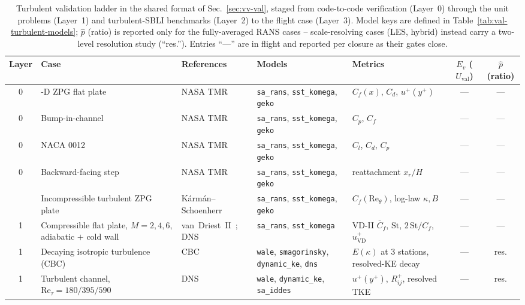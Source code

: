 \documentclass[journal,biblatex]{new-aiaa}
\newcommand{\Field}[1]{\texttt{#1}}
\begin{document}
\begin{table}[H]
\centering\scriptsize\setlength{\tabcolsep}{3.5pt}
\caption{Turbulent validation ladder in the shared format of
Sec.~\ref{sec:vv-val}, staged from code-to-code verification (Layer~0) through
the unit problems (Layer~1) and turbulent-SBLI benchmarks (Layer~2) to the
flight case (Layer~3). Model keys are defined in
Table~\ref{tab:val-turbulent-models}; $\hat p$ (ratio) is reported only for the
fully-averaged RANS cases -- scale-resolving cases (LES, hybrid) instead carry
a two-level resolution study (``res.''). Entries ``---'' are in flight and
reported per closure as their gates close.}
\label{tab:val-turbulent}
\begin{tabularx}{\linewidth}{@{}c >{\raggedright\arraybackslash}p{2.15cm} >{\raggedright\arraybackslash}p{1.75cm} >{\raggedright\arraybackslash}p{1.9cm} X c c@{}}
\toprule
Layer & Case & References & Models & Metrics & $E_v$ ($U_{\mathrm{val}}$) & $\hat p$ (ratio) \\
\midrule
0 & 2-D ZPG flat plate & NASA TMR~\cite{noauthor_turbulence_nodate} & \Field{sa\_rans}, \Field{sst\_komega}, \Field{geko} & $C_f(x)$, $C_d$, $u^+(y^+)$ & --- & --- \\
0 & Bump-in-channel & NASA TMR & \Field{sa\_rans}, \Field{sst\_komega}, \Field{geko} & $C_p$, $C_f$ & --- & --- \\
0 & NACA 0012 & NASA TMR & \Field{sa\_rans}, \Field{sst\_komega}, \Field{geko} & $C_l$, $C_d$, $C_p$ & --- & --- \\
0 & Backward-facing step & NASA TMR & \Field{sa\_rans}, \Field{sst\_komega}, \Field{geko} & reattachment $x_r/H$ & --- & --- \\
\addlinespace
1 & Incompressible turbulent ZPG plate & Kármán--Schoenherr~\cite{white_viscous_2005} & \Field{sa\_rans}, \Field{sst\_komega}, \Field{geko} & $C_f(\mathrm{Re}_\theta)$, log-law $\kappa,B$ & --- & --- \\
1 & Compressible flat plate, $M{=}2,4,6$, adiabatic $+$ cold wall & van~Driest~II~\cite{van_driest_investigation_1952}; DNS~\cite{pirozzoli_direct_2011,zhang_direct_2018} & \Field{sa\_rans}, \Field{sst\_komega} & VD-II $\bar C_f$, $\mathrm{St}$, $2\,\mathrm{St}/C_f$, $u_{\mathrm{VD}}^+$ & --- & --- \\
1 & Decaying isotropic turbulence (CBC) & CBC~\cite{comte-bellot_simple_1971} & \Field{wale}, \Field{smagorinsky}, \Field{dynamic\_ke}, \Field{dns} & $E(\kappa)$ at 3 stations, resolved-KE decay & --- & res. \\
1 & Turbulent channel, $\mathrm{Re}_\tau{=}180/395/590$ & DNS~\cite{moser_direct_1999,lee_direct_2015} & \Field{wale}, \Field{dynamic\_ke}, \Field{sa\_iddes} & $u^+(y^+)$, $R_{ij}^+$, resolved TKE & --- & res. \\

\end{tabularx}
\end{table}
\end{document}
